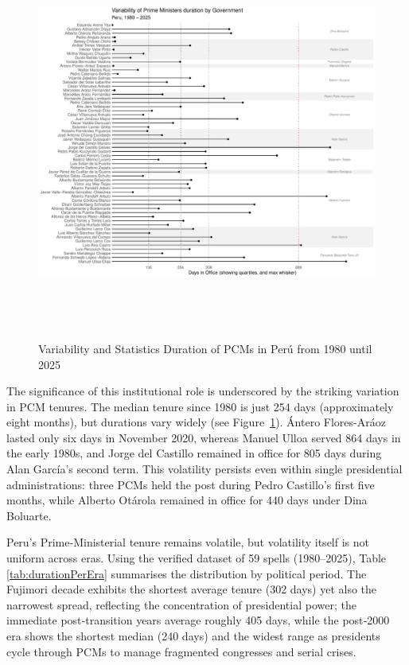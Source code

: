 \documentclass[a4paper, 12pt]{article}
\begin{document}
\begin{figure}[ht]
\centering
\includegraphics[width=\textwidth,height=13cm]{durationLolli.pdf}
\caption{Variability and Statistics Duration of PCMs in Perú from 1980 until 2025}  
\label{durationLolli} 
\end{figure}

The significance of this institutional role is underscored by the striking variation in PCM tenures. The median tenure since 1980 is just 254 days (approximately eight months), but durations vary widely (see Figure~\ref{durationLolli}). Ántero Flores-Aráoz lasted only six days in November 2020, whereas Manuel Ulloa served 864 days in the early 1980s, and Jorge del Castillo remained in office for 805 days during Alan García’s second term. This volatility persists even within single presidential administrations: three PCMs held the post during Pedro Castillo’s first five months, while Alberto Otárola remained in office for 440 days under Dina Boluarte. 



Peru’s Prime‑Ministerial tenure remains volatile, but volatility itself is not uniform across eras.  Using the verified dataset of 59 spells (1980–2025), Table \ref{tab:durationPerEra} summarises the distribution by political period.  The Fujimori decade exhibits the shortest average tenure (302 days) yet also the narrowest spread, reflecting the concentration of presidential power; the immediate post‑transition years average roughly 405 days, while the post‑2000 era shows the shortest median (240 days) and the widest range as presidents cycle through PCMs to manage fragmented congresses and serial crises.
\end{document}
